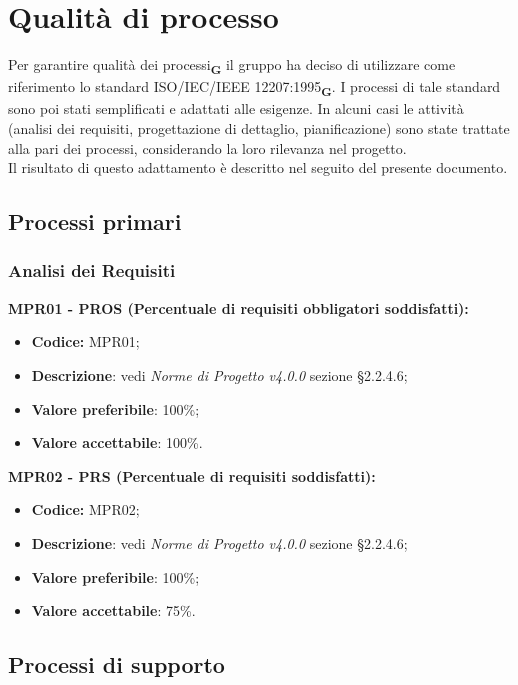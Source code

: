 \section{Qualità di processo}
Per garantire qualità dei processi\textsubscript{\textbf{G}} il gruppo ha deciso di utilizzare come riferimento lo standard ISO/IEC/IEEE 12207:1995\textsubscript{\textbf{G}}.
I processi di tale standard sono poi stati semplificati e adattati alle esigenze.
In alcuni casi le attività (analisi dei requisiti, progettazione di dettaglio, pianificazione) sono state trattate alla pari dei processi, considerando la loro rilevanza nel progetto.\\Il risultato di questo adattamento è descritto nel seguito del presente documento.
\subsection{Processi primari}
\subsubsection{Analisi dei Requisiti}
\textbf{MPR01 - PROS (Percentuale di requisiti obbligatori soddisfatti):}
\begin{itemize}
    \item \textbf{Codice:} MPR01;
    \item \textbf{Descrizione}: vedi \textit{Norme di Progetto v4.0.0} sezione \S 2.2.4.6;
    \item \textbf{Valore preferibile}: 100\%;
    \item \textbf{Valore accettabile}: 100\%.
\end{itemize}
\textbf{MPR02 - PRS (Percentuale di requisiti soddisfatti):}
\begin{itemize}
    \item \textbf{Codice:} MPR02;
    \item \textbf{Descrizione}: vedi \textit{Norme di Progetto v4.0.0} sezione \S 2.2.4.6;
    \item \textbf{Valore preferibile}: 100\%;
    \item \textbf{Valore accettabile}: 75\%.
\end{itemize}
\subsection{Processi di supporto}
